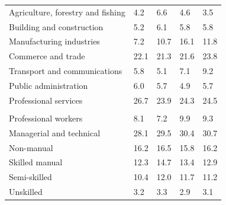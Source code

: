 \documentclass{article}
\begin{document}
\begin{table}[h]
\begin{tabular}{KTTTT}
    \hline
Agriculture, forestry and fishing  & 4.2& 6.6& 4.6& 3.5\\
Building and construction & 5.2& 6.1& 5.8& 5.8\\
Manufacturing industries &  7.2& 10.7& 16.1& 11.8\\
Commerce and trade  & 22.1& 21.3& 21.6& 23.8\\
Transport and communications  & 5.8& 5.1& 7.1& 9.2\\
Public administration & 6.0& 5.7& 4.9& 5.7\\
Professional services & 26.7& 23.9& 24.3& 24.5\\
\hline
    \\ 
    \hline
Professional workers  & 8.1& 7.2 & 9.9& 9.3\\
Managerial and technical & 28.1& 29.5& 30.4& 30.7\\
Non-manual & 16.2& 16.5& 15.8& 16.2\\
Skilled manual & 12.3& 14.7& 13.4& 12.9\\
Semi-skilled & 10.4& 12.0& 11.7& 11.2\\
Unskilled  & 3.2& 3.3& 2.9& 3.1\\
\end{tabular}
\end{table}
\pagebreak
\end{document}
